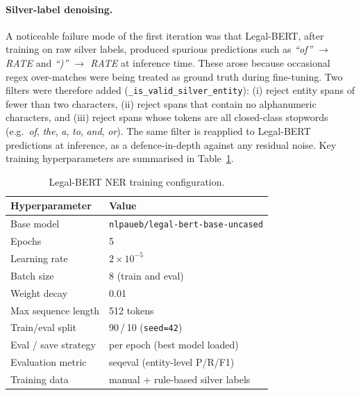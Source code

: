 \documentclass[assignment.tex]{subfiles}
\begin{document}
\paragraph{Silver-label denoising.}
A noticeable failure mode of the first iteration was that Legal-BERT, after
training on raw silver labels, produced spurious predictions such as
\textit{``of'' $\rightarrow$ RATE} and \textit{``)'' $\rightarrow$ RATE} at
inference time.  These arose because occasional regex over-matches were being
treated as ground truth during fine-tuning.  Two filters were therefore added
(\texttt{\_is\_valid\_silver\_entity}):
(i) reject entity spans of fewer than two characters,
(ii) reject spans that contain no alphanumeric characters, and
(iii) reject spans whose tokens are all closed-class stopwords
(e.g.\ \textit{of}, \textit{the}, \textit{a}, \textit{to}, \textit{and}, \textit{or}).
The same filter is reapplied to Legal-BERT predictions at inference, as a
defence-in-depth against any residual noise.
Key training hyperparameters are summarised in Table~\ref{tab:ner-hparams}.

\begin{table}[H]
    \centering
    \caption{Legal-BERT NER training configuration.}
    \label{tab:ner-hparams}
    \begin{tabular}{@{}ll@{}}
        \toprule
        \textbf{Hyperparameter} & \textbf{Value} \\
        \midrule
        Base model            & \texttt{nlpaueb/legal-bert-base-uncased} \\
        Epochs                & 5 \\
        Learning rate         & $2 \times 10^{-5}$ \\
        Batch size            & 8 (train and eval) \\
        Weight decay          & 0.01 \\
        Max sequence length   & 512 tokens \\
        Train/eval split      & 90\,/\,10 (\texttt{seed=42}) \\
        Eval / save strategy  & per epoch (best model loaded) \\
        Evaluation metric     & seqeval (entity-level P/R/F1) \\
        Training data         & manual + rule-based silver labels \\
        \bottomrule
    \end{tabular}
\end{table}
\end{document}
